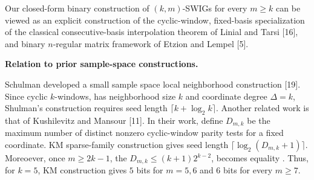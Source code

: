\documentclass[10pt,a4paper]{article}
\begin{document}



Our closed-form binary construction of $(k,m)$-SWIGs for every $m\geq k$
can be viewed as an explicit construction of the cyclic-window, fixed-basis
specialization of the classical consecutive-basis interpolation theorem of
Linial and Tarsi [16], and binary
$n$-regular matrix framework of Etzion and Lempel [5].\par




\par\medskip\noindent\textbf{Relation to prior sample-space constructions.}\par




Schulman developed a small sample space local neighborhood
construction [19]. Since cyclic $k$-windows, has neighborhood size $k$ and coordinate degree
$\Delta=k$, Shulman’s construction requires seed length $\lceil k+\log_{2}k\rceil$. Another related work is that of
Kushilevitz and Mansour [11]. In their work,
define $D_{m,k}$ be the maximum number
of distinct nonzero cyclic-window parity tests for a fixed
coordinate. KM sparse-family construction gives seed length
$\lceil\log_{2}(D_{m,k}+1)\rceil$. Moreoever, once $m\geq 2k-1$, the
$D_{m,k}\leq(k+1)2^{k-2}$, becomes equality . Thus,
for $k=5$, KM construction gives $5$ bits for $m=5,6$
and $6$ bits for every $m\geq 7$.\par
\end{document}
